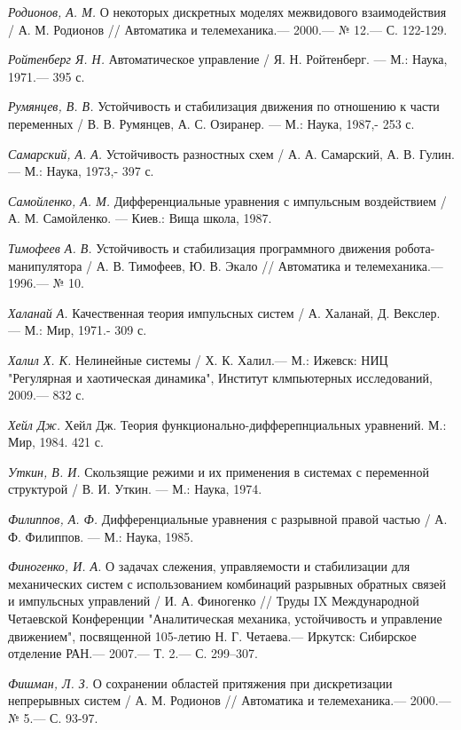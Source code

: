 \begin{thebibliography}{10}
	{\it Родионов, А. М.} О некоторых дискретных моделях межвидового взаимодействия
	/ А. М. Родионов // Автоматика и телемеханика.— 2000.— № 12.— С. 122-129.
	
	{\it Ройтенберг Я. Н.} Автоматическое управление /
	Я. Н. Ройтенберг. — М.: Наука, 1971.— 395 с.
	
	{\it Румянцев, В. В.} Устойчивость и стабилизация движения по отношению к части переменных /
	В. В. Румянцев, А. С. Озиранер. — М.: Наука, 1987,- 253 с.
	
	{\it Самарский, А. А.} Устойчивость разностных схем /
	А. А. Самарский, А. В. Гулин. — М.: Наука, 1973,- 397 с.
	
	{\it Самойленко, А. М.} Дифференциальные уравнения с импульсным воздействием /
	А. М. Самойленко. — Киев.: Вища школа, 1987.
	
	{\it Тимофеев А. В.} Устойчивость и стабилизация программного движения робота-манипулятора /
	А. В. Тимофеев, Ю. В. Экало // Автоматика и телемеханика.— 1996.— № 10.
	
	{\it Халанай А.} Качественная теория импульсных систем /
	А. Халанай, Д. Векслер. — М.: Мир, 1971.- 309 с.
	
	{\it Халил Х. К.} Нелинейные системы / Х. К. Халил.— М.: Ижевск: НИЦ "Регулярная и хаотическая динамика", Институт клмпьютерных исследований, 2009.— 832 с.
	
	{\it Хейл Дж.} Хейл Дж. Теория функционально-дифферепнциальных уравнений. М.: Мир,
	1984. 421 с.
	
	{\it Уткин, В. И.} Скользящие режими и их применения в системах с переменной структурой /
	В. И. Уткин. — М.: Наука, 1974.
	
	{\it Филиппов, А. Ф.} Дифференциальные уравнения с разрывной правой частью /
	А. Ф. Филиппов. — М.: Наука, 1985.
	
	{\it Финогенко, И. А.} О задачах слежения, управляемости и стабилизации для механических систем с использованием комбинаций разрывных обратных связей и импульсных управлений /
	И. А. Финогенко // Труды IX Международной Четаевской Конференции "Аналитическая механика, устойчивость и управление движением", посвященной 105-летию Н. Г. Четаева.— Иркутск: Сибирское отделение РАН.— 2007.— Т. 2.— С. 299–307.
	
	{\it Фишман, Л. З.} О сохранении областей притяжения при дискретизации непрерывных систем
	/ А. М. Родионов // Автоматика и телемеханика.— 2000.— № 5.— С. 93-97.
	

\end{thebibliography}
